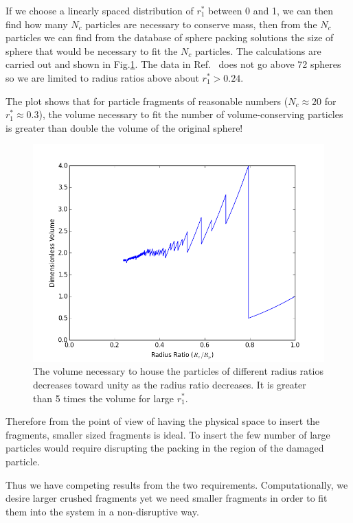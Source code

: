 If we choose a linearly spaced distribution of $r_1^*$ between 0 and 1, we can then find how many $N_c$ particles are necessary to conserve mass, then from the $N_c$ particles we can find from the database of sphere packing solutions the size of sphere that would be necessary to fit the $N_c$ particles. The calculations are carried out and shown in Fig.\ref{fig:volume-ratio}. The data in Ref.~\cite{gensane2003dense} does not go above 72 spheres so we are limited to radius ratios above about $r_1^* > 0.24$.

The plot shows that for particle fragments of reasonable numbers ($N_c\approx 20$ for $r_1^*\approx 0.3$), the volume necessary to fit the number of volume-conserving particles is greater than double the volume of the original sphere! 

\begin{figure}[!t]
\centering
    \includegraphics[width=\singleimagewidth]{chapters/figures/crush-fragments/fragment-volume-ratio.png}
    \caption{The volume necessary to house the particles of different radius ratios decreases toward unity as the radius ratio decreases. It is greater than 5 times the volume for large $r_1^*$.}
    \label{fig:volume-ratio}
\end{figure}

Therefore from the point of view of having the physical space to insert the fragments, smaller sized fragments is ideal. To insert the few number of large particles would require disrupting the packing in the region of the damaged particle.

Thus we have competing results from the two requirements. Computationally, we desire larger crushed fragments yet we need smaller fragments in order to fit them into the system in a non-disruptive way.


